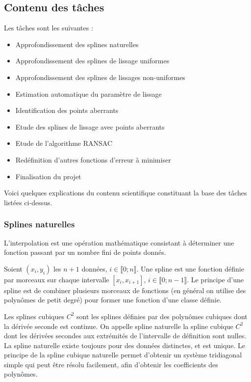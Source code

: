 \documentclass[a4paper,12pt]{article} %
\begin{document}
	\subsection{Contenu des tâches}
	Les tâches sont les suivantes :
\begin{itemize}
\item Approfondissement des splines naturelles
\item Approfondissement des splines de lissage uniformes
\item Approfondissement des splines de lissages non-uniformes
\item Estimation automatique du paramètre de lissage
\item Identification des points aberrants
\item Etude des splines de lissage avec points aberrants
\item Etude de l'algorithme RANSAC
\item Redéfinition d'autres fonctions d'erreur à minimiser
\item Finalisation du projet
\end{itemize}

Voici quelques explications du contenu scientifique constituant la base des tâches listées ci-dessus.
\subsubsection*{Splines naturelles}
L’interpolation est une opération mathématique consistant à déterminer une fonction passant par un nombre fini de points donnés.

Soient $(x_i,y_i)$ les $n+1$ données, $i\in\llbracket 0; n \rrbracket$.
Une spline est une fonction définie par morceaux sur chaque intervalle $[x_i, x_{i+1}]$, $i\in\llbracket 0; n-1 \rrbracket$.
Le principe d'une spline est de combiner plusieurs morceaux de fonctions (en général on utilise des polynômes de petit degré) pour former une fonction d'une classe définie.

Les splines cubiques $C^2$ sont les splines définies par des polynômes cubiques dont la dérivée seconde est continue. On appelle spline naturelle la spline cubique $C^2$ dont les dérivées secondes aux extrémités de l'intervalle de définition sont nulles. La spline naturelle existe toujours pour des données distinctes, et est unique. Le principe de la spline cubique naturelle permet d'obtenir un système tridiagonal simple qui peut être résolu facilement, afin d'obtenir les coefficients des polynômes.
\end{document}
